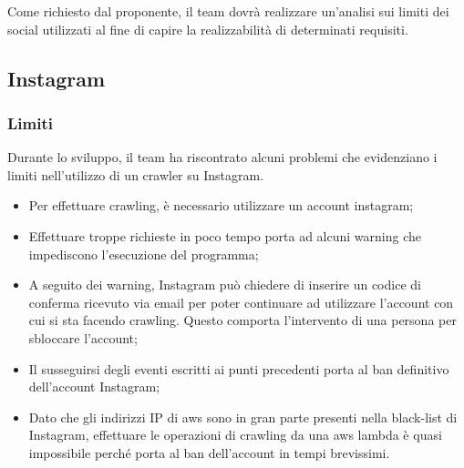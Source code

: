 Come richiesto dal proponente, il team dovrà realizzare un'analisi sui limiti dei social utilizzati al fine di capire la realizzabilità di determinati requisiti.

\subsection{Instagram}
\subsubsection{Limiti}
Durante lo sviluppo, il team ha riscontrato alcuni problemi che evidenziano i limiti nell'utilizzo di un crawler su Instagram.
\begin{itemize}
    \item Per effettuare crawling, è necessario utilizzare un account instagram;
    \item Effettuare troppe richieste in poco tempo porta ad alcuni warning che impediscono l'esecuzione del programma;
    \item A seguito dei warning, Instagram può chiedere di inserire un codice di conferma ricevuto via email per poter continuare ad utilizzare l'account con cui si sta facendo crawling. Questo comporta l'intervento di una persona per sbloccare l'account;
    \item Il susseguirsi degli eventi escritti ai punti precedenti porta al ban definitivo dell'account Instagram;
    \item Dato che gli indirizzi IP di aws sono in gran parte presenti nella black-list di Instagram, effettuare le operazioni di crawling da una aws lambda è quasi impossibile perché porta al ban dell'account in tempi brevissimi.
\end{itemize}

